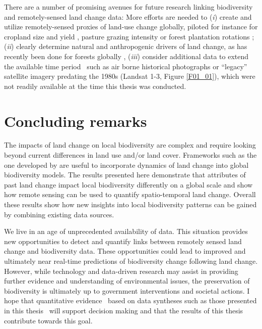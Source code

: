 There are a number of promising avenues for future research linking biodiversity and remotely-sensed land change data: More efforts are needed to (\textit{i}) create and utilize remotely-sensed proxies of land-use change globally, piloted for instance for cropland size \citep{Fritz2015} and yield \citep{Lobell2015}, pasture grazing intensity \citep{Rufin2015,Aguiar2017} or forest plantation rotations \citep{LeMaire2014}; (\textit{ii}) clearly determine natural and anthropogenic drivers of land change, as has recently been done for forests globally \citep{Curtis2018}, (\textit{iii}) consider additional data to extend the available time period \textendash\ such as air borne historical photographs \citep{SZABO2011,Cousins2015} or “legacy” satellite imagery predating the 1980s (\eg Landsat 1-3, Figure \ref{F01_01}), which were not readily available at the time this thesis was conducted.

\section{Concluding remarks}
\label{C06_05}

The impacts of land change on local biodiversity are complex and require looking beyond current differences in land use and/or land cover. Frameworks such as the one developed by \cite{Watson2014} are useful to incorporate dynamics of land change into global biodiversity models. The results presented here demonstrate that attributes of past land change impact local biodiversity differently on a global scale and show how remote sensing can be used to quantify spatio-temporal land change. Overall these results show how new insights into local biodiversity patterns can be gained by combining existing data sources.

We live in an age of unprecedented availability of data. This situation provides new opportunities to detect and quantify links between remotely sensed land change and biodiversity data. These opportunities could lead to improved and ultimately near real-time predictions of biodiversity change following land change. However, while technology and data-driven research may assist in providing further evidence and understanding of environmental issues, the preservation of biodiversity is ultimately up to government interventions and societal actions. I hope that quantitative evidence \textendash\ based on data syntheses such as those presented in this thesis \textendash\ will support decision making and that the results of this thesis contribute towards this goal.    


\clearpage
%

%  
